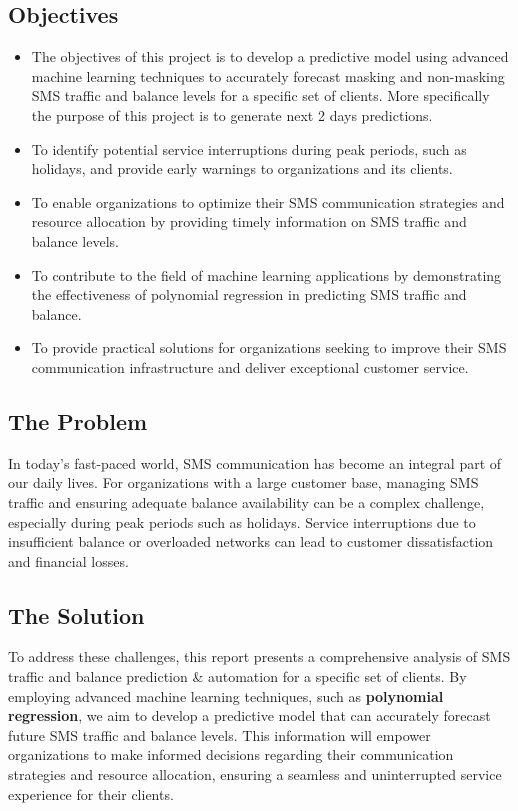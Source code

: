 \documentclass[12pt]{book} %
\begin{document}
\subsection{Objectives​}
\begin{itemize}
    \item The objectives of this project is to develop a predictive model using advanced machine learning techniques to accurately forecast masking and non-masking SMS traffic and balance levels for a specific set of clients. More specifically the purpose of this project is to generate next 2 days predictions.​
    \item To identify potential service interruptions during peak periods, such as holidays, and provide early warnings to organizations and its clients.​
    \item To enable organizations to optimize their SMS communication strategies and resource allocation by providing timely information on SMS traffic and balance levels.​
    \item To contribute to the field of machine learning applications by demonstrating the effectiveness of polynomial regression in predicting SMS traffic and balance.​
    \item To provide practical solutions for organizations seeking to improve their SMS communication infrastructure and deliver exceptional customer service.​
\end{itemize}





\subsection{The Problem}

In today's fast-paced world, SMS communication has become an integral part of our daily lives. For organizations with a large customer base, managing SMS traffic and ensuring adequate balance availability can be a complex challenge, especially during peak periods such as holidays. Service interruptions due to insufficient balance or overloaded networks can lead to customer dissatisfaction and financial losses.

\subsection{The Solution}

To address these challenges, this report presents a comprehensive analysis of SMS traffic and balance prediction \& automation for a specific set of clients. By employing advanced machine learning techniques, such as \textbf{polynomial regression}, we aim to develop a predictive model that can accurately forecast future SMS traffic and balance levels. This information will empower organizations to make informed decisions regarding their communication strategies and resource allocation, ensuring a seamless and uninterrupted service experience for their clients.
\end{document}
